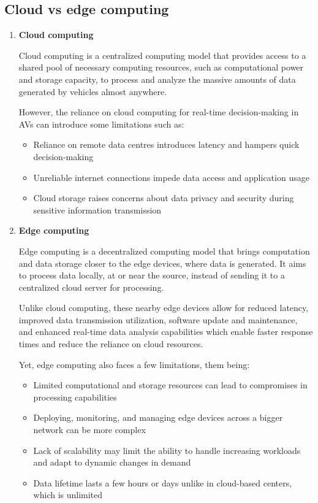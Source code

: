 \documentclass[10pt,oneside,english,a4paper]{article}
\begin{document}
\subsection{Cloud vs edge computing}
\begin{enumerate}[A]
    \item \textbf{Cloud computing} 
    \par Cloud computing is a centralized computing model that provides access to a shared pool of necessary computing resources, such as computational power and storage capacity, to process and analyze the massive amounts of data generated by vehicles almost anywhere.
    \par However, the reliance on cloud computing for real-time decision-making in AVs can introduce some limitations such as:
    \begin{itemize}
        \item Reliance on remote data centres introduces latency and hampers quick decision-making
        \item Unreliable internet connections impede data access and application usage
        \item Cloud storage raises concerns about data privacy and security during sensitive information transmission
    \end{itemize}
    
    \item \textbf{Edge computing} 
    \par Edge computing is a decentralized computing model that brings computation and data storage closer to the edge devices, where data is generated. It aims to process data locally, at or near the source, instead of sending it to a centralized cloud server for processing.
    \par Unlike cloud computing, these nearby edge devices allow for reduced latency, improved data transmission utilization, software update and maintenance, and enhanced real-time data analysis capabilities which enable faster response times and reduce the reliance on cloud resources.
    \par Yet, edge computing also faces a few limitations, them being:
    \begin{itemize}
        \item Limited computational and storage resources can lead to compromises in processing capabilities
        \item Deploying, monitoring, and managing edge devices across a bigger network can be more complex
        \item Lack of scalability may limit the ability to handle increasing workloads and adapt to dynamic changes in demand
        \item Data lifetime lasts a few hours or days unlike in cloud-based centers, which is unlimited 
\end{itemize}
\end{enumerate}
\end{document}
